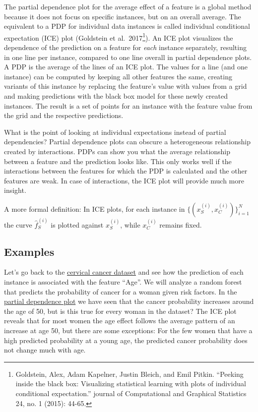 \documentclass[
  11pt,
]{scrbook}
\begin{document}
The partial dependence plot for the average effect of a feature is a global method because it does not focus on specific instances, but on an overall average.
The equivalent to a PDP for individual data instances is called individual conditional expectation (ICE) plot (Goldstein et al.~2017\footnote{Goldstein, Alex, Adam Kapelner, Justin Bleich, and Emil Pitkin. ``Peeking inside the black box: Visualizing statistical learning with plots of individual conditional expectation.'' journal of Computational and Graphical Statistics 24, no. 1 (2015): 44-65.}).
An ICE plot visualizes the dependence of the prediction on a feature for \emph{each} instance separately, resulting in one line per instance, compared to one line overall in partial dependence plots.
A PDP is the average of the lines of an ICE plot.
The values for a line (and one instance) can be computed by keeping all other features the same, creating variants of this instance by replacing the feature's value with values from a grid and making predictions with the black box model for these newly created instances.
The result is a set of points for an instance with the feature value from the grid and the respective predictions.

What is the point of looking at individual expectations instead of partial dependencies?
Partial dependence plots can obscure a heterogeneous relationship created by interactions.
PDPs can show you what the average relationship between a feature and the prediction looks like.
This only works well if the interactions between the features for which the PDP is calculated and the other features are weak.
In case of interactions, the ICE plot will provide much more insight.

A more formal definition:
In ICE plots, for each instance in \(\{(x_{S}^{(i)},x_{C}^{(i)})\}_{i=1}^N\) the curve \(\hat{f}_S^{(i)}\) is plotted against \(x^{(i)}_{S}\), while \(x^{(i)}_{C}\) remains fixed.

\hypertarget{examples-4}{%
\subsection{Examples}\label{examples-4}}

Let's go back to the \protect\hyperlink{cervical}{cervical cancer dataset} and see how the prediction of each instance is associated with the feature ``Age''.
We will analyze a random forest that predicts the probability of cancer for a woman given risk factors.
In the \protect\hyperlink{pdp}{partial dependence plot} we have seen that the cancer probability increases around the age of 50, but is this true for every woman in the dataset?
The ICE plot reveals that for most women the age effect follows the average pattern of an increase at age 50, but there are some exceptions:
For the few women that have a high predicted probability at a young age, the predicted cancer probability does not change much with age.
\end{document}
